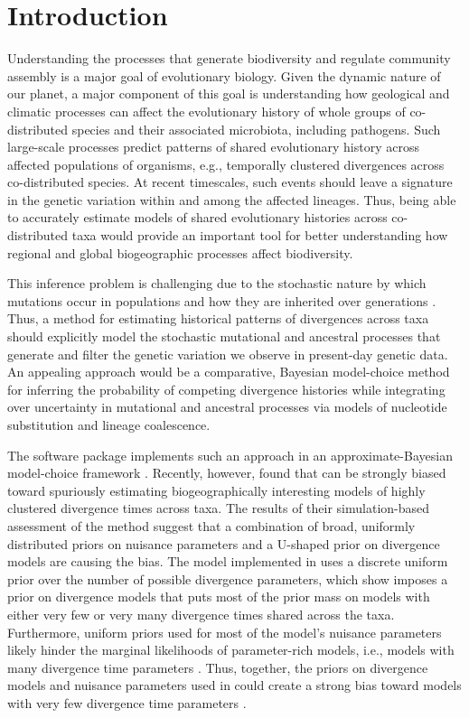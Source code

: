 \section*{Introduction}
Understanding the processes that generate biodiversity and regulate
community assembly is a major goal of evolutionary biology.
Given the dynamic nature of our planet, a major component of this goal is
understanding how geological and climatic processes can affect the
evolutionary history of whole groups of co-distributed species and their
associated microbiota, including pathogens.
Such large-scale processes predict patterns of shared evolutionary history
across affected populations of organisms, e.g., temporally clustered
divergences across co-distributed species.
At recent timescales, such events should leave a signature in the genetic
variation within and among the affected lineages.
Thus, being able to accurately estimate models of shared evolutionary
histories across co-distributed taxa would provide an important
tool for better understanding how regional and global biogeographic
processes affect biodiversity.

This inference problem is challenging due to the stochastic nature by which
mutations occur in populations and how they are inherited over generations
\citep{Hudson1990,WakeleyCoalescent}.
Thus, a method for estimating historical patterns of divergences across taxa
should explicitly model the stochastic mutational and ancestral processes that
generate and filter the genetic variation we observe in present-day genetic
data.
An appealing approach would be a comparative, Bayesian model-choice method for
inferring the probability of competing divergence histories while integrating
over uncertainty in mutational and ancestral processes via models of nucleotide
substitution and lineage coalescence.

The software package \msb implements such an approach in an
approximate-Bayesian model-choice framework \citep{Hickerson2006,Huang2011}.
Recently, however, \citet{Oaks2012} found that \msb can be strongly biased
toward spuriously estimating biogeographically interesting models of highly
clustered divergence times across taxa.
The results of their simulation-based assessment of the method suggest that a
combination of broad, uniformly distributed priors on nuisance parameters and a
U-shaped prior on divergence models are causing the bias.
The model implemented in \msb uses a discrete uniform prior over the number of
possible divergence parameters, which \citet{Oaks2012} show imposes a prior on
divergence models that puts most of the prior mass on models with either very
few or very many divergence times shared across the taxa.
Furthermore, uniform priors used for most of the model's nuisance parameters
likely hinder the marginal likelihoods of parameter-rich models, i.e., models
with many divergence time parameters \citep{Lindley1957}.
Thus, together, the priors on divergence models and nuisance parameters used in
\msb could create a strong bias toward models with very few divergence time
parameters \citep{Oaks2012}.

